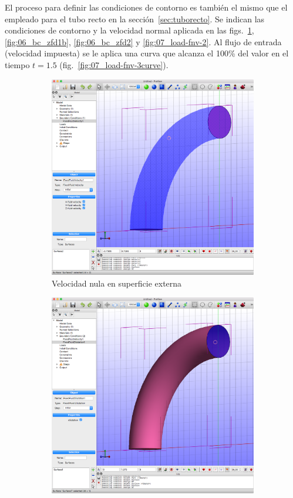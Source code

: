 El proceso para definir las condiciones de contorno es también el mismo que el empleado para el tubo recto en la sección~\ref{sec:tuborecto}.
Se indican las condiciones de contorno y la velocidad normal aplicada en las figs.~\ref{fig:05_bc_zfv1b}, \ref{fig:06_bc_zfd1b}, \ref{fig:06_bc_zfd2} y \ref{fig:07_load-fnv-2}.
Al flujo de entrada (velocidad impuesta) se le aplica una curva que alcanza el 100\% del valor en el tiempo $t=1.5$ (fig.~\ref{fig:07_load-fnv-3curve}).
\begin{figure}[!ht]
\centering
\begin{subfigure}[b]{0.48\textwidth}
\centering
\includegraphics[width=\linewidth]{figuras_4/05_bc_zfv1b.png}
\caption{Velocidad nula en superficie externa}
\label{fig:05_bc_zfv1b}
\end{subfigure}
\hfil
\begin{subfigure}[b]{0.48\textwidth}
\includegraphics[width=\linewidth]{figuras_4/06_bc_zfd1b.png}

\end{subfigure}
\end{figure}
